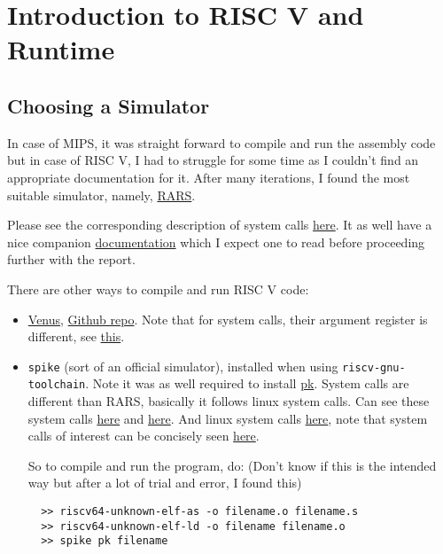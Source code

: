 \chapter{Introduction to RISC V and Runtime}

\section{Choosing a Simulator}

In case of MIPS, it was straight forward to compile and run the assembly code but in case of RISC V, I had to struggle for some time as I couldn't find an appropriate documentation for it. After many iterations, I found the most suitable simulator, namely, \href{https://github.com/TheThirdOne/rars}{RARS}.

Please see the corresponding description of system calls \href{https://github.com/TheThirdOne/rars/wiki/Environment-Calls}{here}. It as well have a nice companion \href{https://github.com/TheThirdOne/rars/wiki}{documentation} which I expect one to read before proceeding further with the report.

There are other ways to compile and run RISC V code:

\begin{itemize}

  \item \href{http://www.kvakil.me/venus/}{Venus}, \href{https://github.com/kvakil/venus}{Github repo}. Note that for system calls, their argument register is different, see \href{https://github.com/TheThirdOne/rars/issues/45}{this}. 

  \item \texttt{spike} (sort of an official simulator), installed when using \texttt{riscv-gnu-toolchain}. Note it was as well required to install \href{https://github.com/riscv/riscv-pk}{pk}. System calls are different than RARS, basically it follows linux system calls. Can see these system calls \href{https://github.com/riscv/riscv-pk/blob/master/pk/syscall.c}{here} and \href{https://github.com/riscv/riscv-pk/blob/master/pk/syscall.h}{here}. And linux system calls \href{http://man7.org/linux/man-pages/man2/syscalls.2.html}{here}, note that system calls of interest can be concisely seen \href{https://rv8.io/syscalls.html}{here}.
  
  So to compile and run the program, do: (Don't know if this is the intended way but after a lot of trial and error, I found this)
  
  \begin{verbatim}
  >> riscv64-unknown-elf-as -o filename.o filename.s 
  >> riscv64-unknown-elf-ld -o filename filename.o 
  >> spike pk filename
  \end{verbatim}

\end{itemize}

